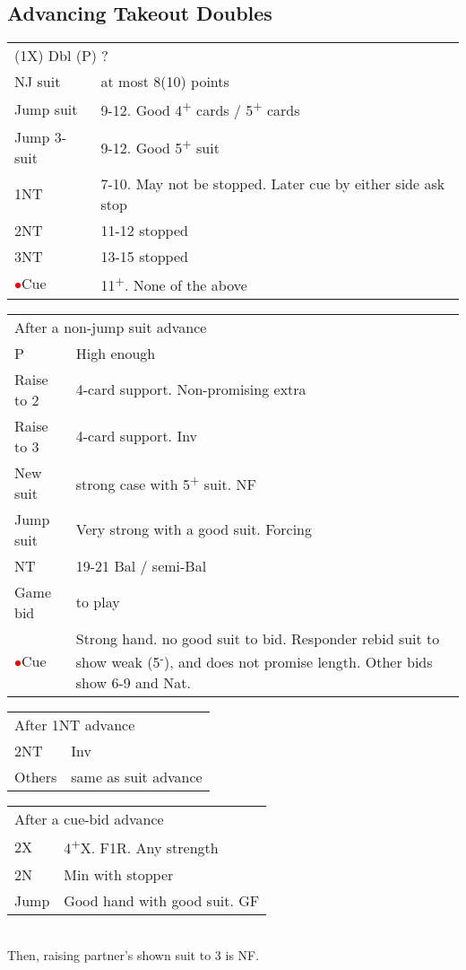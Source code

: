 \documentclass{article}
\newcommand{\nt}{\relsize{-1}NT\relsize{1}}
\newcommand{\up}{\textsuperscript{+}}
\newcommand{\down}{\textsuperscript{-}}
\newcommand{\al}{\textcolor{red}{$\bullet$}}
\begin{document}
\subsection{Advancing Takeout Doubles}
\begin{tabular}{|l|p{6.5cm}}
	\multicolumn{2}{l}{(1X) Dbl (P) ?} \\
  NJ suit & at most 8(10) points \\
	Jump suit & 9-12. Good 4\up{} cards / 5\up{} cards \\
	Jump 3-suit & 9-12. Good 5\up{} suit \\
	1\nt{} & 7-10. May not be stopped. Later cue by either side ask stop \\
	2\nt{} & 11-12 stopped \\
	3\nt{} & 13-15 stopped \\
	\al{}Cue & 11\up{}. None of the above \\
\end{tabular}

\medskip

\begin{tabular}{|l|p{6.5cm}}
	\multicolumn{2}{l}{After a non-jump suit advance} \\
  P & High enough \\
	Raise to 2 & 4-card support. Non-promising extra \\
	Raise to 3 & 4-card support. Inv \\
	New suit & strong case with 5\up{} suit. NF \\
	Jump suit & Very strong with a good suit. Forcing \\
	\nt{} & 19-21 Bal / semi-Bal \\
	Game bid & to play \\
	\al{}Cue & Strong hand. no good suit to bid. Responder rebid suit to show weak (5\down{}), and does not promise length. Other bids show 6-9 and Nat. \\
\end{tabular}

\medskip

\begin{tabular}{|l|p{6.5cm}}
	\multicolumn{2}{l}{After 1\nt{} advance} \\
  2\nt{} & Inv \\
	Others & same as suit advance \\
\end{tabular}

\medskip

\begin{tabular}{|l|p{6.5cm}}
	\multicolumn{2}{l}{After a cue-bid advance} \\
  2X & 4\up{}X. F1R. Any strength \\
	2N & Min with stopper \\
	Jump & Good hand with good suit. GF \\
\end{tabular}\\
Then, raising partner's shown suit to 3 is NF.
\end{document}

